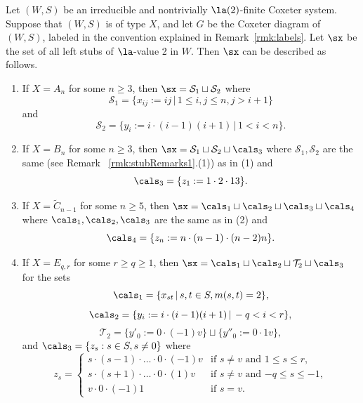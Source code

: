 \begin{thm}
    \label{thm:stubDescription}
    Let $(W,S)$ be an irreducible and nontrivially $\la(2)$-finite Coxeter system. Suppose that $(W,S)$ is of type
    $X$, and let $G$ be the Coxeter diagram of $(W,S)$, labeled in the convention explained in Remark~\ref{rmk:labels}.
    Let $\sx$ be the set of all left stubs of $\la$-value 2 in $W$.  Then $\sx$ can be described as follows. 
    \begin{enumerate}
        \item If $X=A_n$ for some $n\ge 3$, then $\sx=\mathcal{S}_1\sqcup\mathcal{S}_2$ where 
            \[
            \mathcal{S}_1=\{x_{ij}:=ij\,\vert\, 1\le i,j\le n,j>i+1\}\]
            and
            \[
                \mathcal{S}_2=\{y_i:=i\cdot
                (i-1)(i+1)\,\vert\, 1< i<n\}.
            \]
        \item If $X=B_n$ for some $n\ge 3$, then $\sx=\mathcal{S}_1\sqcup\mathcal{S}_2\sqcup \cals_3$ where
            $\mathcal{S}_1,\mathcal{S}_2$ are the same \textup{(}see Remark
           ~\ref{rmk:stubRemarks1}.\textup{(}1\textup{)}\textup{)} as in \textup{(}1\textup{)}
            and 
            \[
                \cals_3=\{z_1:=1\cdot 2\cdot 13\}.
            \] 
        \item If $X=\tilde C_{n-1}$ for some $n\ge 5$, then $\sx =\cals_1\sqcup \cals_2\sqcup
             \cals_3\sqcup\cals_4$ where $\cals_1,\cals_2,\cals_3$ are the same as in
             \textup{(}2\textup{)} and 
            \[
                \cals_4=\{z_n:=n\cdot (n-1)\cdot (n-2)n\}.
            \]
        \item If $X=E_{q,r}$ for some $r\ge q\ge 1$, then $\sx=\cals_1\sqcup\cals_2\sqcup
             \mathcal{T}_2\sqcup\cals_3$ for the sets 
            \[
            \cals_1=\{x_{st}\,\vert\,s,t\in S, m(s,t)=2\},\]
            \[
                \cals_2=\{y_{i}:= i\cdot (i-1)(i+1)\,\vert\, -q< i<r\},
            \]
            \[
                \mathcal{T}_2=\{y'_0:=0\cdot (-1)v\}\sqcup\{y''_0:=0\cdot 1v\},
            \]
            and $\cals_3=\{z_s: s\in S, s\neq 0\}$ where 
            \[
                z_s= 
                \begin{cases}
                    s\cdot (s-1)\cdot \ldots \cdot 0\cdot (-1)v &\text{if $s\neq v$ and $1\le s\le
                    r$},\\
                    s\cdot (s+1)\cdot \ldots \cdot 0\cdot (1)v & \text{if $s\neq v$ and $-q\le s\le -1$},\\
                    v\cdot 0 \cdot (-1)1&\text{if $s=v$}.

\end{cases}\]
\end{enumerate}
\end{thm}
